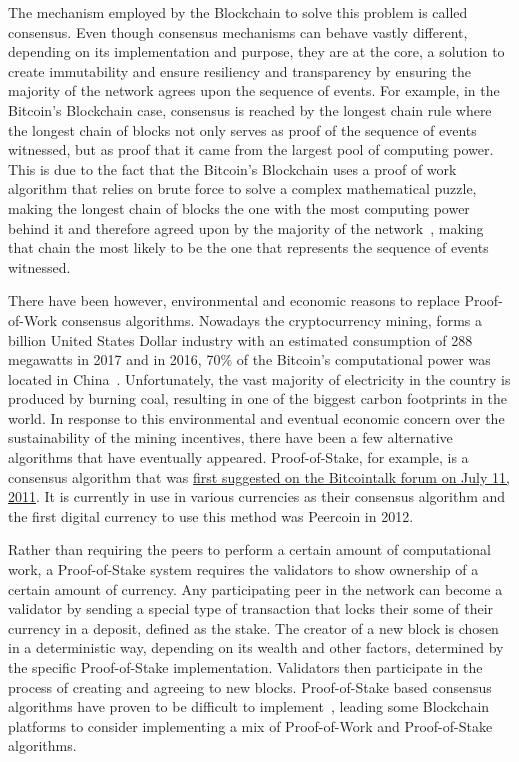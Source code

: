 The mechanism employed by the Blockchain to solve this problem is called
consensus.  Even though consensus mechanisms can behave vastly different,
depending on its implementation and purpose, they are at the core, a solution
to create immutability and ensure resiliency and transparency by ensuring the
majority of the network agrees upon the sequence of events. For example, in the
Bitcoin's Blockchain case, consensus is reached by the longest chain rule where
the longest chain of blocks not only serves as proof of the sequence of events
witnessed, but as proof that it came from the largest pool of computing power.
This is due to the fact that the Bitcoin's Blockchain uses a proof of work
algorithm that relies on brute force to solve a complex mathematical puzzle,
making the longest chain of blocks the one with the most computing power behind
it and therefore agreed upon by the majority of the
network~\cite{Baars2016,Wood2017}, making that chain the most likely to be the
one that represents the sequence of events witnessed.

There have been however, environmental and economic reasons to replace
Proof-of-Work consensus algorithms. Nowadays the cryptocurrency mining, forms a
billion United States Dollar industry with an estimated consumption of 288
megawatts in 2017 and in 2016, 70\% of the Bitcoin's computational power was
located in China~\cite{BitcoinMining2017}.  Unfortunately, the vast majority of
electricity in the country is produced by burning coal, resulting in one of the
biggest carbon footprints in the world. In response to this environmental and
eventual economic concern over the sustainability of the mining incentives,
there have been a few alternative algorithms that have eventually appeared.
Proof-of-Stake, for example, is a consensus algorithm that was
\href{https://bitcointalk.org/index.php?topic=27787.0}{first suggested on the
Bitcointalk forum on July 11, 2011}. It is currently in use in various
currencies as their consensus algorithm and the first digital currency to use
this method was Peercoin in 2012. 

Rather than requiring the peers to perform a certain amount of computational
work, a Proof-of-Stake system requires the validators to show ownership of a
certain amount of currency. Any participating peer in the network can become a
validator by sending a special type of transaction that locks their some of
their currency in a deposit, defined as the stake. The creator of a new block
is chosen in a deterministic way, depending on its wealth and other factors,
determined by the specific Proof-of-Stake implementation. Validators then
participate in the process of creating and agreeing to new blocks.
Proof-of-Stake based consensus algorithms have proven to be difficult to
implement~\cite{EthereumSlasher2014}, leading some Blockchain platforms to
consider implementing a mix of Proof-of-Work and Proof-of-Stake algorithms.

